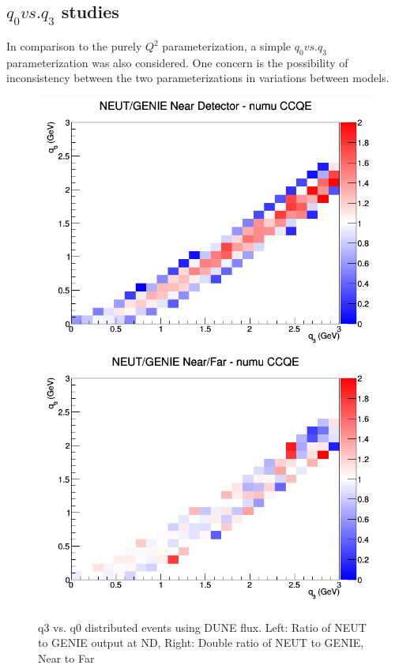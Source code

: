 \documentclass[12pt]{article}
\begin{document}
\subsection{$q_0 vs. q_3$ studies}

In comparison to the purely $Q^2$ parameterization, a simple $q_0 vs. q_3$ parameterization was also considered. One concern is the possibility of inconsistency between the two parameterizations in variations between models. 
\newline
\begin{figure}[h]
\includegraphics[width=\linewidth]{q0_q3_ratios/CCQE_NEUT_GENIE_numu_near_q3_q0.png}
\endminipage
{}
\includegraphics[width=\linewidth]{q0_q3_ratios/CCQE_NEUT_GENIE_numu_NF_q3_q0.png}
\endminipage
\caption{q3 vs. q0 distributed events using DUNE flux. Left: Ratio of NEUT to GENIE output at ND, Right: Double ratio of NEUT to GENIE, Near to Far}
\end{figure}
\end{document}
